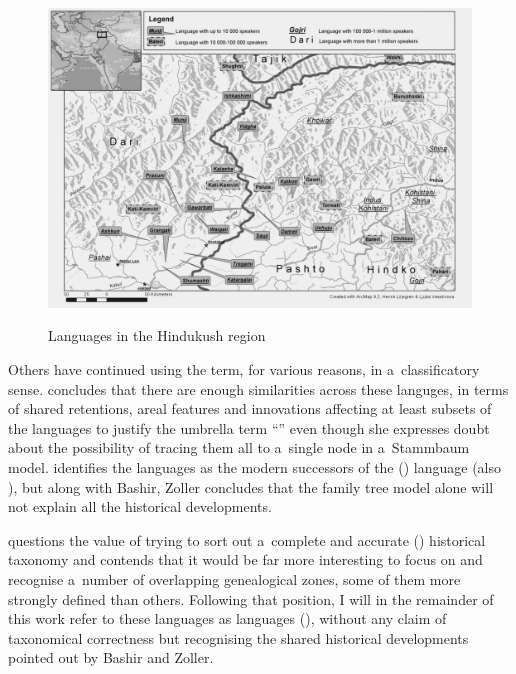 \begin{figure}[t]
\caption{Languages in the Hindukush region}
\includegraphics[width=\textwidth]{figures/ch1map2.pdf}
\label{map:1-2}
\end{figure}

Others have continued using the term, for various reasons, in a~classificatory sense. \citet[822]{bashir2003} concludes that there are enough similarities across these languges, in terms of shared retentions, areal features and innovations affecting at least subsets of the languages to justify the umbrella term ``\iliDardic'' even though she expresses doubt about the possibility of tracing them all to a~single node in a~Stammbaum model. \citet[10--11]{zoller2005} identifies the \iliDardic languages as the modern successors of the \iliMiddleIndoAryan (\iliMIA) language \iliGandhari (also \iliGandhari \iliPrakrit), but along with Bashir, Zoller concludes that the family tree model alone will not explain all the historical developments. 


\citet[460]{masica1991} questions the value of trying to sort out a~complete and accurate \iliNewIndoAryan (\iliNIA) historical taxonomy and contends that it would be far more interesting to focus on and recognise a~number of overlapping genealogical zones, some of them more strongly defined than others. Following that position, I will in the remainder of this work refer to these languages as \iliHindukushIndoAryan languages (\iliHKIA), without any claim of taxonomical correctness but recognising the shared historical developments pointed out by Bashir and Zoller. 

